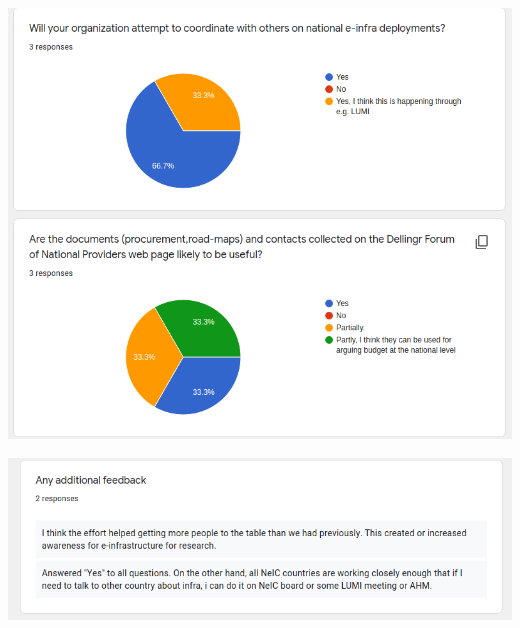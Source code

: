 \documentclass{article}
\begin{document}
\begin{appendices}
\begin{center}
\includegraphics[scale=0.6]{hlt_responses_2.png}
\end{center}

\begin{center}
\includegraphics[scale=0.6]{hlt_responses_3.png}
\end{center}

\end{appendices}
\end{document}
